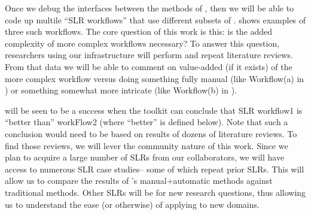 



Once we debug the interfaces between the methods of , then we will be able to
code up multile ``SLR workflows'' that use different subsets of .
 shows examples of three such workflows. 
The core question of this work is this:  is the added complexity of more complex workflows
necessary? To answer this question, researchers using our infrastructure will perform and repeat literature reviews. From  that  data  we  will  be  able  to  comment  on  value-added  (if  it  exists)  of  the more
complex workflow versus  doing something fully manual (like Workflow(a) in ) or something somewhat more intricate (like Workflow(b) in ).


{\IT} will be seen to be a  success
when the toolkit can conclude that   SLR workflow1 is ``better than'' workFlow2 (where ``better'' is defined below).
Note that such a conclusion would need to be based on results of dozens of literature reviews.  
To find those reviews, we will lever
the community nature of this work.
Since we plan to acquire a large number of SLRs
from our collaborators, we will have access to numerous SLR case studies-- some of which 
repeat prior SLRs. This will   allow us to compare the results of {\IT}'s manual+automatic methods
against traditional methods. 
Other SLRs will be for new research questions, thus allowing us
to understand the ease (or otherwise) of applying {\IT} to new domains.

